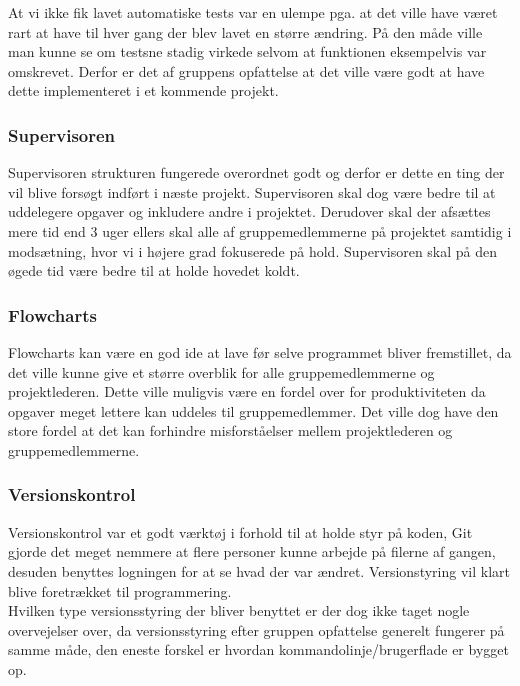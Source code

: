 At vi ikke fik lavet automatiske tests var en ulempe pga. at det ville have været rart at have til hver gang der blev lavet en større ændring. På den måde ville man kunne se om testsne stadig virkede selvom at funktionen eksempelvis var omskrevet. Derfor er det af gruppens opfattelse at det ville være godt at have dette implementeret i et kommende projekt.\\

\subsubsection{Supervisoren}
Supervisoren strukturen fungerede overordnet godt og derfor er dette en ting der vil blive forsøgt indført i næste projekt. Supervisoren skal dog være bedre til at uddelegere opgaver og inkludere andre i projektet. Derudover skal der afsættes mere tid end 3 uger ellers skal alle af gruppemedlemmerne på projektet samtidig i modsætning, hvor vi i højere grad fokuserede på hold. Supervisoren skal på den øgede tid være bedre til at holde hovedet koldt.\\

\subsubsection{Flowcharts}
Flowcharts kan være en god ide at lave før selve programmet bliver fremstillet, da det ville kunne give et større overblik for alle gruppemedlemmerne og projektlederen. Dette ville muligvis være en fordel over for produktiviteten da opgaver meget lettere kan uddeles til gruppemedlemmer. Det ville dog have den store fordel at det kan forhindre misforståelser mellem projektlederen og gruppemedlemmerne.\\

\subsubsection{Versionskontrol}
Versionskontrol var et godt værktøj i forhold til at holde styr på koden, Git gjorde det meget nemmere at flere personer kunne arbejde på filerne af gangen, desuden benyttes logningen for at se hvad der var ændret. Versionstyring vil klart blive foretrækket til programmering.\\

Hvilken type versionsstyring der bliver benyttet er der dog ikke taget nogle overvejelser over, da versionsstyring efter gruppen opfattelse generelt fungerer på samme måde, den eneste forskel er hvordan kommandolinje/brugerflade er bygget op.\\


